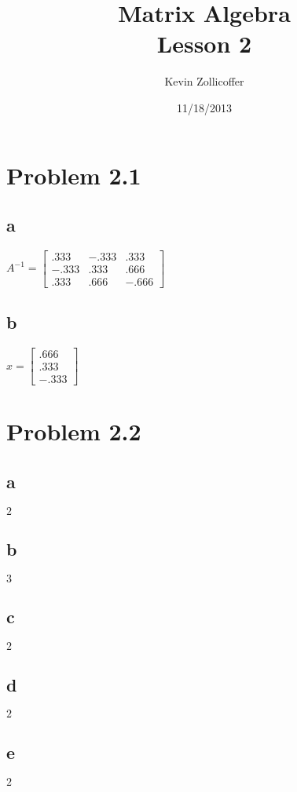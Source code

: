 \documentclass{article}
\author{Kevin Zollicoffer}
\title{Matrix Algebra\\Lesson 2}
\date{11/18/2013}
\begin{document}
\maketitle


\section*{Problem 2.1}
\subsection*{a}
$ A^{-1} = 
\begin{bmatrix}
  .333 & -.333 & .333 \\
  -.333 & .333 & .666 \\
  .333 & .666 & -.666
\end{bmatrix}
$

\subsection*{b}
$ x = 
\begin{bmatrix}
  .666 \\
  .333 \\
  -.333
\end{bmatrix}
$


\section*{Problem 2.2}
\subsection*{a}
$2$

\subsection*{b}
$3$

\subsection*{c}
$2$

\subsection*{d}
$2$

\subsection*{e}
$2$
\end{document}
